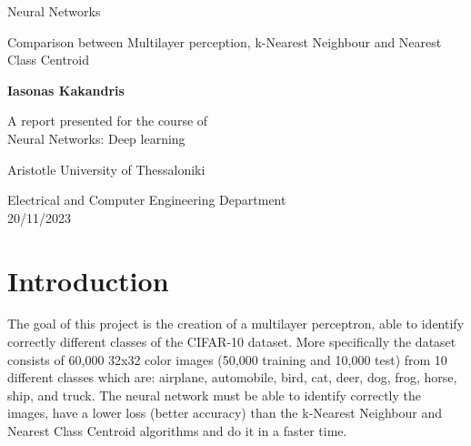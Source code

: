 \documentclass{article}
\begin{document}


\begin{titlepage}
   \begin{center}
       \vspace*{5cm}

       {\fontsize{50}{60}\selectfont Neural Networks}

       \vspace{0.5cm}
        Comparison between Multilayer perception, k-Nearest Neighbour and Nearest Class Centroid 
            
       \vspace{1.5cm}

       \textbf{Iasonas Kakandris}

       \vfill
            
       A report presented for the course of\\
       Neural Networks: Deep learning
            
       \vspace{0.8cm}
     
       Aristotle University of Thessaloniki
            
       Electrical and Computer Engineering Department\\
       20/11/2023
            
   \end{center}
\end{titlepage}

\tableofcontents





\pagebreak

\section{Introduction}
The goal of this project is the creation of a multilayer perceptron, able to identify correctly different classes of the CIFAR-10 dataset. More specifically the dataset consists of 60,000 32x32 color images (50,000 training and 10,000 test) from 10 different classes which are: airplane, automobile, bird, cat, deer, dog, frog, horse, ship, and truck. The neural network must be able to identify correctly the images, have a lower loss (better accuracy) than the k-Nearest Neighbour and Nearest Class Centroid algorithms and do it in a faster time. 
\pagebreak
\end{document}
